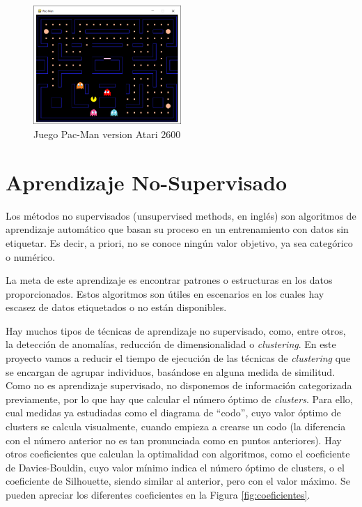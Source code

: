 		\begin{figure}[!h]			
			\centering
			\includegraphics[width=0.50\textwidth]{images/chapter_2/pacman}	
			\caption{Juego Pac-Man version Atari 2600}
			\label{fig:pacman}
		\end{figure}
		
	
		\newpage

\section{Aprendizaje No-Supervisado}

	Los métodos no supervisados (unsupervised methods, en inglés) son algoritmos de aprendizaje automático que basan su proceso en un entrenamiento con datos sin etiquetar. Es decir, a priori, no se conoce ningún valor objetivo, ya sea categórico o numérico. 
	
	La meta de este aprendizaje es encontrar patrones o estructuras en los datos proporcionados. Estos algoritmos son útiles en escenarios en los cuales hay escasez de datos etiquetados o no están disponibles.
	
	Hay muchos tipos de técnicas de aprendizaje no supervisado, como, entre otros, la detección de anomalías, reducción de dimensionalidad o \textit{clustering}. En este proyecto vamos a reducir el tiempo de ejecución de las técnicas de \textit{clustering} que se encargan de agrupar individuos, basándose en alguna medida de similitud. Como no es aprendizaje supervisado, no disponemos de información categorizada previamente, por lo que hay que calcular el número óptimo de \textit{clusters}. Para ello, cual medidas ya estudiadas como el diagrama de ``codo'', cuyo valor óptimo de clusters se calcula visualmente, cuando empieza a crearse un codo (la diferencia con el número anterior no es tan pronunciada como en puntos anteriores). Hay otros coeficientes que calculan la optimalidad con algoritmos, como el coeficiente de Davies-Bouldin, cuyo valor mínimo indica el número óptimo de clusters, o el coeficiente de Silhouette, siendo similar al anterior, pero con el valor máximo. Se pueden apreciar los diferentes coeficientes en la Figura \ref{fig:coeficientes}. 


